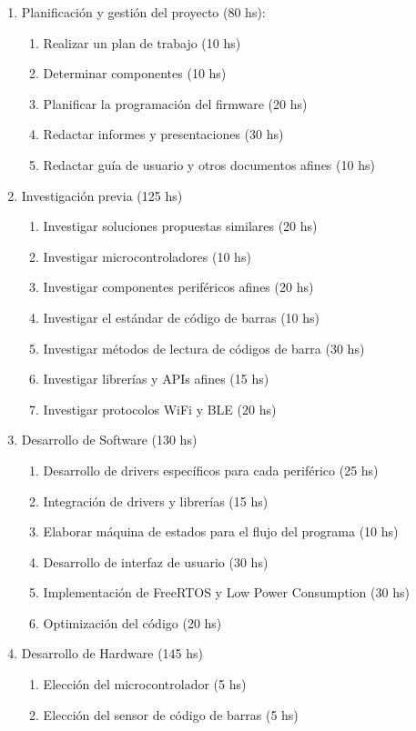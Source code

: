 \documentclass[
11pt, %
codirector, %
]{charter}
\begin{document}
\begin{enumerate}
\item Planificación y gestión del proyecto (80 hs):
	\begin{enumerate}
	\item Realizar un plan de trabajo (10 hs)
	\item Determinar componentes (10 hs)
    \item Planificar la programación del firmware (20 hs)
	\item Redactar informes y presentaciones (30 hs)
    \item Redactar guía de usuario y otros documentos afines (10 hs)
	\end{enumerate}
\item Investigación previa (125 hs)
	\begin{enumerate}
	\item Investigar soluciones propuestas similares (20 hs)
	\item Investigar microcontroladores (10 hs)
	\item Investigar componentes periféricos afines (20 hs)
    \item Investigar el estándar de código de barras (10 hs)
    \item Investigar métodos de lectura de códigos de barra (30 hs)
    \item Investigar librerías y APIs afines (15 hs)
    \item Investigar protocolos WiFi y BLE (20 hs)
	\end{enumerate}
\item Desarrollo de Software (130 hs)
	\begin{enumerate}
	\item Desarrollo de drivers específicos para cada periférico (25 hs)
	\item Integración de drivers y librerías (15 hs)
	\item Elaborar máquina de estados para el flujo del programa (10 hs)
	\item Desarrollo de interfaz de usuario (30 hs)
    \item Implementación de FreeRTOS y Low Power Consumption (30 hs)
    \item Optimización del código (20 hs)
	\end{enumerate}
 \item Desarrollo de Hardware (145 hs)
	\begin{enumerate}
	\item Elección del microcontrolador (5 hs)
	\item Elección del sensor de código de barras (5 hs)

\end{enumerate}
\end{enumerate}
\end{document}

